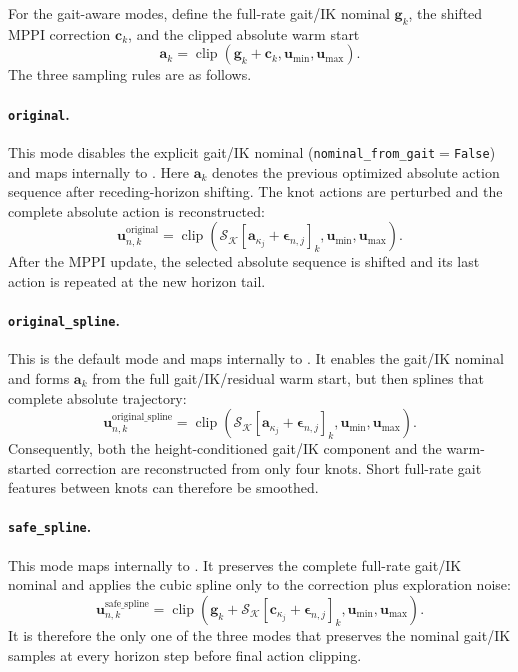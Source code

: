 \documentclass[11pt,a4paper]{article}
\newcommand{\clip}{\operatorname{clip}}
\newcommand{\code}[1]{\texttt{#1}}
\begin{document}
For the gait-aware modes, define the full-rate gait/IK nominal
$\bm{g}_k$, the shifted MPPI correction $\bm{c}_k$, and the clipped absolute
warm start
\begin{equation}
  \bm{a}_k
  =\clip(\bm{g}_k+\bm{c}_k,\bm{u}_{\min},\bm{u}_{\max}).
\end{equation}
The three sampling rules are as follows.

\paragraph{\code{original}.}
This mode disables the explicit gait/IK nominal
(\code{nominal\_from\_gait}$=$\code{False}) and maps internally to
. Here $\bm{a}_k$ denotes the
previous optimized absolute action sequence after receding-horizon shifting.
The knot actions are perturbed and the complete absolute action is
reconstructed:
\begin{equation}
  \boxed{
  \bm{u}_{n,k}^{\mathrm{original}}
  =\clip\left(
    \mathcal{S}_{\mathcal{K}}
    [\bm{a}_{\kappa_j}+\bm{\epsilon}_{n,j}]_k,
    \bm{u}_{\min},\bm{u}_{\max}
  \right).
  }
\end{equation}
After the MPPI update, the selected absolute sequence is shifted and its last
action is repeated at the new horizon tail.

\paragraph{\code{original\_spline}.}
This is the default mode and maps internally to
. It enables the gait/IK nominal and
forms $\bm{a}_k$ from the full gait/IK/residual warm start, but then splines
that complete absolute trajectory:
\begin{equation}
  \boxed{
  \bm{u}_{n,k}^{\mathrm{original\_spline}}
  =\clip\left(
    \mathcal{S}_{\mathcal{K}}
    [\bm{a}_{\kappa_j}+\bm{\epsilon}_{n,j}]_k,
    \bm{u}_{\min},\bm{u}_{\max}
  \right).
  }
\end{equation}
Consequently, both the height-conditioned gait/IK component and the
warm-started correction are reconstructed from only four knots. Short
full-rate gait features between knots can therefore be smoothed.

\paragraph{\code{safe\_spline}.}
This mode maps internally to . It
preserves the complete full-rate gait/IK nominal and applies the cubic spline
only to the correction plus exploration noise:
\begin{equation}
  \boxed{
  \bm{u}_{n,k}^{\mathrm{safe\_spline}}
  =\clip\left(
    \bm{g}_k+
    \mathcal{S}_{\mathcal{K}}
    [\bm{c}_{\kappa_j}+\bm{\epsilon}_{n,j}]_k,
    \bm{u}_{\min},\bm{u}_{\max}
  \right).
  }
\end{equation}
It is therefore the only one of the three modes that preserves the nominal
gait/IK samples at every horizon step before final action clipping.
\end{document}
